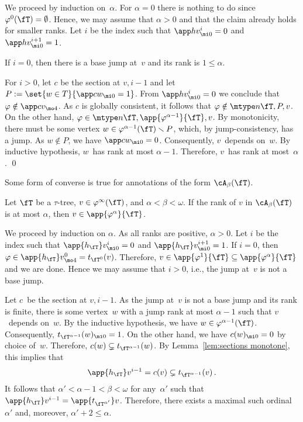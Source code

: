 \documentclass{LMCS}
\begin{document}
\proof
We proceed by induction on~$\alpha$.
For $\alpha = 0$ there is nothing to do since
$\varphi^0(\fT) = \emptyset$.
Hence, we may assume that $\alpha > 0$ and that the claim already holds for smaller
ranks.
Let $i$ be the index such that $\app hv^i_{\mi0}=0$ and $\app hv^{i+1}_{\mi0}=1$.

If $i=0$, then there is a base jump at~$v$ and its rank is $1 \leq \alpha$.

For $i>0$, let $c$ be the section at $v,i-1$
and let $P:=\set{w\in T}{\app cw_{\mi0}=1}$.
From $\app hv^i_{\mi0}=0$ we conclude that $\varphi \notin \app cv_{\mo4}$.
As $c$ is globally consistent, it follows that $\varphi \notin \mtype n{\fT,P,v}$.
On the other hand, $\varphi\in\mtype n{\fT,\app{\varphi^{\alpha-1}}{\fT},v}$.
By monotonicity,
there must be some vertex $w \in \varphi^{\alpha-1}(\fT) \smallsetminus P$,
which, by jump-consis\-tency, has a jump.
As $w \notin P$, we have $\app cw_{\mi0}=0$. Consequently, $v$~depends on~$w$.
By inductive hypothesis, $w$~has rank at most $\alpha-1$.
Therefore, $v$~has rank at most~$\alpha$.
\qed

Some form of converse is true for annotations of the form $\cA_\beta(\fT)$.
\begin{lem}\label{lem:min rank bounds stage}
Let $\fT$ be a $\tau$-tree, $v \in \varphi^\infty(\fT)$, and $\alpha<\beta<\omega$.
If the rank of $v$ in $\cA_\beta(\fT)$ is at most $\alpha$,
then $v\in\app{\varphi^{\alpha}}{\fT}$.
\end{lem}

\proof
We proceed by induction on $\alpha$.
As all ranks are positive, $\alpha>0$.
Let $i$ be the index such that $\app{h_{\fT}}v^i_{\mi0}=0$ and $\app{h_{\fT}}v^{i+1}_{\mi0}=1$.
If $i=0$,
then $\varphi\in\app{h_{\fT}}v^0_{\mo4}=t_{\fT^0}(v)$.
Therefore, $v\in\app{\varphi^1}{\fT}\subseteq\app{\varphi^{\alpha}}{\fT}$ and we are done.
Hence we may assume that $i>0$, i.e., the jump at~$v$ is not a base jump.

Let $c$~be the section at $v,i-1$.
As the jump at~$v$ is not a base jump and its rank is finite,
there is some vertex~$w$ with a jump rank at most $\alpha-1$
such that $v$~depends on~$w$.
By the inductive hypothesis, we have $w\in \varphi^{\alpha-1}(\fT)$.
Consequently, $t_{\fT^{\alpha-1}}(w)_{\mi0}=1$.
On the other hand, we have $c(w)_{\mi0} = 0$ by choice of~$w$.
Therefore, $c(w) \subsetneq t_{\fT^{\alpha-1}}(w)$.
By Lemma~\ref{lem:sections monotone}, this implies that
\begin{align*}
  \app{h_{{\fT}}}v^{i-1} = c(v) \subsetneq t_{\fT^{\alpha-1}}(v)\,.
\end{align*}
It follows that $\alpha'<\alpha-1<\beta<\omega$
for any~$\alpha'$ such that $\app{h_{\fT}}v^{i-1}=\app{t_{\fT^{\alpha'}}}v$.
Therefore, there exists a maximal such ordinal~$\alpha'$ and,
moreover, $\alpha'+2\leq\alpha$.
\end{document}
